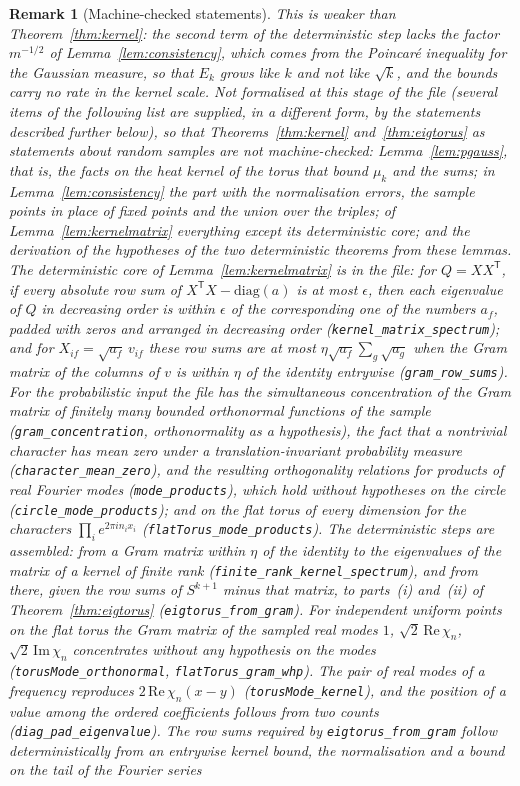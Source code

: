 \documentclass[11pt,a4paper]{article}
\theoremstyle{stmt}
\theoremstyle{defn}
\theoremstyle{rmk}
\newtheorem{remark}[theorem]{Remark}
\numberwithin{equation}{section}
\begin{document}
{\begin{remark}[Machine-checked statements]
This is weaker than Theorem~\ref{thm:kernel}: the second term of the deterministic step lacks the factor $m^{-1/2}$ of Lemma~\ref{lem:consistency}, which comes from the Poincar\'e inequality for the Gaussian measure, so that $E_k$ grows like $k$ and not like $\sqrt k$, and the bounds carry no rate in the kernel scale. Not formalised at this stage of the file (several items of the following list are supplied, in a different form, by the statements described further below), so that Theorems~\ref{thm:kernel} and~\ref{thm:eigtorus} as statements about random samples are not machine-checked: Lemma~\ref{lem:pgauss}, that is, the facts on the heat kernel of the torus that bound $\mu_k$ and the sums; in Lemma~\ref{lem:consistency} the part with the normalisation errors, the sample points in place of fixed points and the union over the triples; of Lemma~\ref{lem:kernelmatrix} everything except its deterministic core; and the derivation of the hypotheses of the two deterministic theorems from these lemmas. The deterministic core of Lemma~\ref{lem:kernelmatrix} is in the file: for $Q=XX^{\mathsf T}$, if every absolute row sum of $X^{\mathsf T}X-\mathrm{diag}(a)$ is at most $\epsilon$, then each eigenvalue of $Q$ in decreasing order is within $\epsilon$ of the corresponding one of the numbers $a_f$, padded with zeros and arranged in decreasing order (\texttt{kernel\_matrix\_spectrum}); and for $X_{if}=\sqrt{a_f}\,v_{if}$ these row sums are at most $\eta\sqrt{a_f}\sum_g\sqrt{a_g}$ when the Gram matrix of the columns of $v$ is within $\eta$ of the identity entrywise (\texttt{gram\_row\_sums}). For the probabilistic input the file has the simultaneous concentration of the Gram matrix of finitely many bounded orthonormal functions of the sample (\texttt{gram\_concentration}, orthonormality as a hypothesis), the fact that a nontrivial character has mean zero under a translation-invariant probability measure (\texttt{character\_mean\_zero}), and the resulting orthogonality relations for products of real Fourier modes (\texttt{mode\_products}), which hold without hypotheses on the circle (\texttt{circle\_mode\_products}); and on the flat torus of every dimension for the characters $\prod_ie^{2\pi in_ix_i}$ (\texttt{flatTorus\_mode\_products}). The deterministic steps are assembled: from a Gram matrix within $\eta$ of the identity to the eigenvalues of the matrix of a kernel of finite rank (\texttt{finite\_rank\_kernel\_spectrum}), and from there, given the row sums of $S^{k+1}$ minus that matrix, to parts~(i) and~(ii) of Theorem~\ref{thm:eigtorus} (\texttt{eigtorus\_from\_gram}). For independent uniform points on the flat torus the Gram matrix of the sampled real modes $1$, $\sqrt2\,\mathrm{Re}\,\chi_n$, $\sqrt2\,\mathrm{Im}\,\chi_n$ concentrates without any hypothesis on the modes (\texttt{torusMode\_orthonormal}, \texttt{flatTorus\_gram\_whp}). The pair of real modes of a frequency reproduces $2\,\mathrm{Re}\,\chi_n(x-y)$ (\texttt{torusMode\_kernel}), and the position of a value among the ordered coefficients follows from two counts (\texttt{diag\_pad\_eigenvalue}). The row sums required by \texttt{eigtorus\_from\_gram} follow deterministically from an entrywise kernel bound, the normalisation and a bound on the tail of the Fourier series 
\end{remark}}
\end{document}
